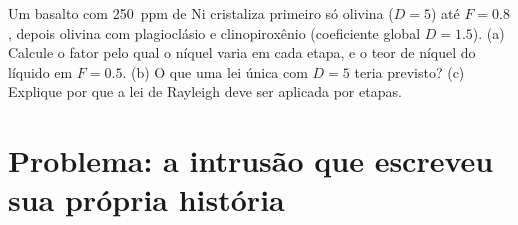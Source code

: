 \begin{exercise}[$\star\star\star$]\label{exo:b2:magmatic-differentiation:12}
Um basalto com \qty{250}{ppm} de Ni cristaliza primeiro só olivina ($D = 5$) até
$F = 0.8$, depois olivina com plagioclásio e clinopiroxênio (coeficiente global $D = 1.5$). (a)
Calcule o fator pelo qual o níquel varia em cada etapa, e o teor de níquel do
líquido em $F = 0.5$. (b) O que uma lei única com $D = 5$ teria previsto?
(c) Explique por que a lei de Rayleigh deve ser aplicada por etapas.
\end{exercise}

\section{Problema: a intrusão que escreveu sua própria história}

